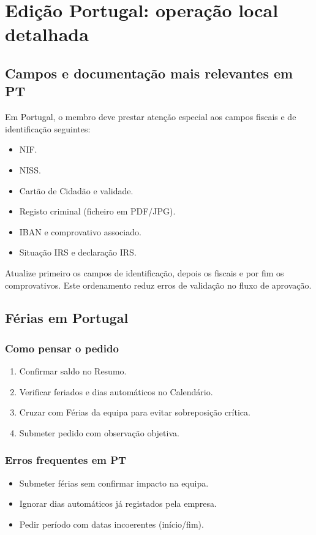 \chapter{Edição Portugal: operação local detalhada}
\section{Campos e documentação mais relevantes em PT}
Em Portugal, o membro deve prestar atenção especial aos campos fiscais e de identificação seguintes:
\begin{itemize}
  \item NIF.
  \item NISS.
  \item Cartão de Cidadão e validade.
  \item Registo criminal (ficheiro em PDF/JPG).
  \item IBAN e comprovativo associado.
  \item Situação IRS e declaração IRS.
\end{itemize}

\begin{manualnote}
Atualize primeiro os campos de identificação, depois os fiscais e por fim os comprovativos. Este ordenamento reduz erros de validação no fluxo de aprovação.
\end{manualnote}

\section{Férias em Portugal}
\subsection{Como pensar o pedido}
\begin{enumerate}
  \item Confirmar saldo no Resumo.
  \item Verificar feriados e dias automáticos no Calendário.
  \item Cruzar com Férias da equipa para evitar sobreposição crítica.
  \item Submeter pedido com observação objetiva.
\end{enumerate}

\subsection{Erros frequentes em PT}
\begin{itemize}
  \item Submeter férias sem confirmar impacto na equipa.
  \item Ignorar dias automáticos já registados pela empresa.
  \item Pedir período com datas incoerentes (início/fim).
\end{itemize}

